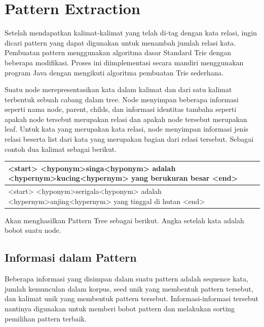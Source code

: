 \section{Pattern Extraction}
Setelah mendapatkan kalimat-kalimat yang telah di-tag dengan kata relasi, ingin dicari pattern yang dapat digunakan untuk menambah jumlah relasi kata. Pembuatan pattern menggunakan algoritma dasar Standard Trie dengan beberapa modifikasi. Proses ini diimplementasi secara mandiri menggunakan program Java dengan mengikuti algoritma pembuatan Trie sederhana.

Suatu node merepresentasikan kata dalam kalimat dan dari satu kalimat terbentuk sebuah cabang dalam tree. Node menyimpan beberapa informasi seperti nama node, parent, childs, dan informasi identitas tambaha seperti apakah node tersebut merupakan relasi dan apakah node tersebut merupakan leaf. Untuk kata yang merupakan kata relasi, node menyimpan informasi jenis relasi beserta list dari kata yang merupakan bagian dari relasi tersebut. Sebagai contoh dua kalimat sebagai berikut.
\begin{center}
\begin{tabular}{ | m{32em} | } 
\hline
<start> <hyponym>singa<hyponym> adalah <hypernym>kucing<hypernym> yang berukuran besar <end> \\ 
\hline
\hline
<start> <hyponym>serigala<hyponym> adalah <hypernym>anjing<hypernym> yang tinggal di hutan <end>\\ 
\hline
\end{tabular}
\end{center}

Akan menghasilkan Pattern Tree sebagai berikut. Angka setelah kata adalah bobot suatu node.

\subsection{Informasi dalam Pattern}
Beberapa informasi yang disimpan dalam suatu pattern adalah sequence kata, jumlah kemunculan dalam korpus,  seed unik yang membentuk pattern tersebut, dan kalimat unik yang membentuk pattern tersebut. Informasi-informasi tersebut nantinya digunakan untuk memberi bobot pattern dan melakukan sorting pemilihan pattern terbaik.

